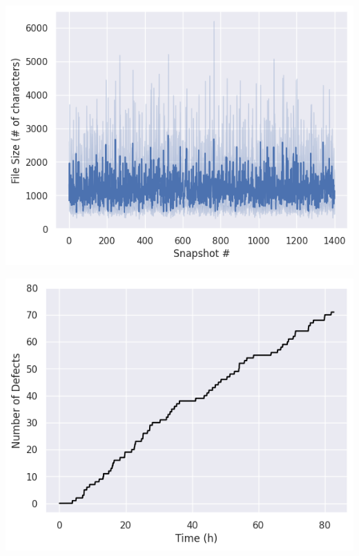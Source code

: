 \begin{minipage}{\textwidth}
\vspace{0.25cm}
  \begin{minipage}[b]{0.49\textwidth}
    \centering
    \includegraphics[scale=0.4]{img/rq2/long-exp1.png}
    \label{fig:rq2long1}
  \end{minipage}
  \hfill
  \begin{minipage}[b]{0.49\textwidth}
    \centering
    \includegraphics[scale=0.4]{img/rq2/long-exp2.png}
    \label{fig:rq2long2}
\end{minipage}
\vspace{0.25cm}
\end{minipage}

